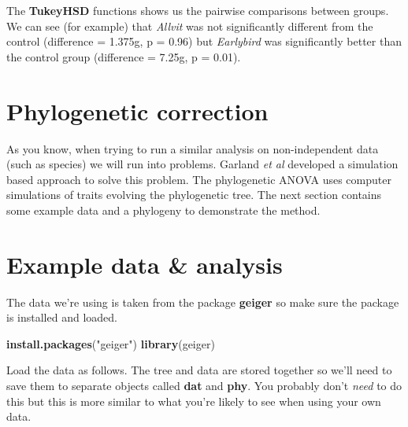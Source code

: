 \documentclass[
]{book}
\newenvironment{Shaded}{\begin{snugshade}}{\end{snugshade}}
\newcommand{\KeywordTok}[1]{\textcolor[rgb]{0.13,0.29,0.53}{\textbf{#1}}}
\newcommand{\NormalTok}[1]{#1}
\newcommand{\OperatorTok}[1]{\textcolor[rgb]{0.81,0.36,0.00}{\textbf{#1}}}
\newcommand{\StringTok}[1]{\textcolor[rgb]{0.31,0.60,0.02}{#1}}
\begin{document}
The \textbf{TukeyHSD} functions shows us the pairwise comparisons between groups. We can see (for example) that \emph{Allvit} was not significantly different from the control (difference = 1.375g, p = 0.96) but \emph{Earlybird} was significantly better than the control group (difference = 7.25g, p = 0.01).

\hypertarget{phylogenetic-correction}{%
\section{Phylogenetic correction}\label{phylogenetic-correction}}

As you know, when trying to run a similar analysis on non-independent data (such as species) we will run into problems. Garland \emph{et al} \citeyearpar{garland93} developed a simulation based approach to solve this problem. The phylogenetic ANOVA uses computer simulations of traits evolving the phylogenetic tree. The next section contains some example data and a phylogeny to demonstrate the method.

\hypertarget{example-data-analysis}{%
\section{Example data \& analysis}\label{example-data-analysis}}

The data we're using is taken from the package \textbf{geiger} \citep{geiger} so make sure the package is installed and loaded.

\begin{Shaded}
\begin{Highlighting}[]
\KeywordTok{install.packages}\NormalTok{(}\StringTok{"geiger"}\NormalTok{)}
\KeywordTok{library}\NormalTok{(geiger)}
\end{Highlighting}
\end{Shaded}

Load the data as follows. The tree and data are stored together so we'll need to save them to separate objects called \textbf{dat} and \textbf{phy}. You probably don't \emph{need} to do this but this is more similar to what you're likely to see when using your own data.

\begin{Shaded}
\end{Shaded}
\end{document}
